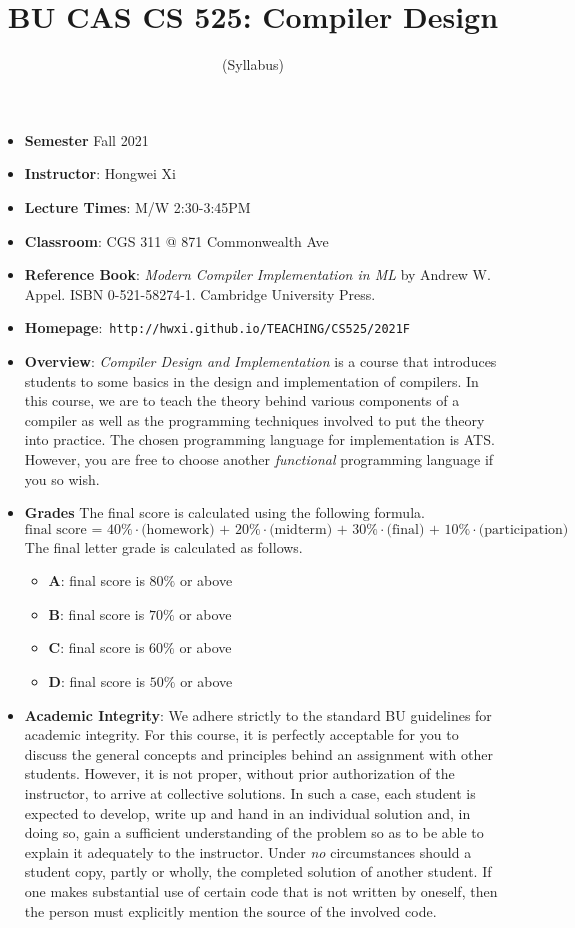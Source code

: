 \documentclass[11pt]{article}
\title{BU CAS CS 525: Compiler Design}
\author{(Syllabus)}
\date{}
\begin{document}
\maketitle
\thispagestyle{empty}

\begin{itemize}
\item {\bf Semester} Fall 2021
\item {\bf Instructor}: Hongwei Xi
\item {\bf Lecture Times}: M/W 2:30-3:45PM
\item {\bf Classroom}: CGS 311 @ 871 Commonwealth Ave
\item {\bf Reference Book}:\kern6pt
{\em Modern Compiler Implementation in ML} by Andrew W. Appel.  ISBN
0-521-58274-1. Cambridge University Press.
\item {\bf Homepage}:~{\tt http://hwxi.github.io/TEACHING/CS525/2021F}
\item {\bf Overview}:
{\em Compiler Design and Implementation} is a course that introduces
students to some basics in the design and implementation of compilers. In
this course, we are to teach the theory behind various components of a
compiler as well as the programming techniques involved to put the theory
into practice. The chosen programming language for implementation is
ATS. However, you are free to choose another {\em functional} programming
language if you so wish.

\item {\bf Grades}
The final score is calculated using the following formula.
\[\mbox{final score = 40\%$\cdot$(homework) + 20\%$\cdot$(midterm) + 30\%$\cdot$(final) + 10\%$\cdot$(participation)}\]
The final letter grade is calculated as follows.
\begin{itemize}
\item{\bf A}: final score is $80\%$ or above
\item{\bf B}: final score is $70\%$ or above
\item{\bf C}: final score is $60\%$ or above
\item{\bf D}: final score is $50\%$ or above
\end{itemize}

\item {\bf Academic Integrity}:
We adhere strictly to the standard BU guidelines for academic
integrity. For this course, it is perfectly acceptable for you to discuss
the general concepts and principles behind an assignment with other
students. However, it is not proper, without prior authorization of the
instructor, to arrive at collective solutions. In such a case, each student
is expected to develop, write up and hand in an individual solution and, in
doing so, gain a sufficient understanding of the problem so as to be able
to explain it adequately to the instructor.  Under {\em no} circumstances
should a student copy, partly or wholly, the completed solution of another
student. If one makes substantial use of certain code that is not written by
oneself, then the person must explicitly mention the source of the involved
code.

\end{itemize}
\end{document}
